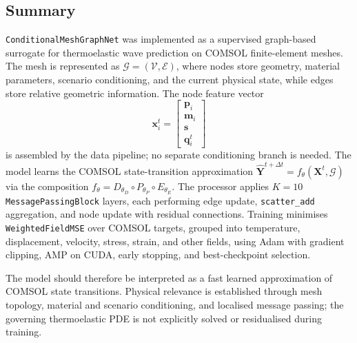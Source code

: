 \subsection{Summary}

\texttt{ConditionalMeshGraphNet} was implemented as a supervised graph-based
surrogate for thermoelastic wave prediction on COMSOL finite-element meshes.
The mesh is represented as \(\mathcal{G}=(\mathcal{V},\mathcal{E})\), where
nodes store geometry, material parameters, scenario conditioning, and the
current physical state, while edges store relative geometric information.
The node feature vector
\[
  \mathbf{x}_i^t
  =
  \begin{bmatrix}
    \mathbf{p}_i \\ \mathbf{m}_i \\ \mathbf{s} \\ \mathbf{q}_i^t
  \end{bmatrix}
\]
is assembled by the data pipeline; no separate conditioning branch is needed.
The model learns the COMSOL state-transition approximation
\(\hat{\mathbf{Y}}^{t+\Delta t}=f_{\theta}(\mathbf{X}^{t},\mathcal{G})\)
via the composition
\(f_{\theta} = D_{\theta_D}\circ P_{\theta_P}\circ E_{\theta_E}\).
The processor applies \(K=10\) \texttt{MessagePassingBlock} layers, each
performing edge update, \texttt{scatter\_add} aggregation, and node update
with residual connections.
Training minimises \texttt{WeightedFieldMSE} over COMSOL targets, grouped
into temperature, displacement, velocity, stress, strain, and other fields,
using Adam with gradient clipping, AMP on CUDA, early stopping, and
best-checkpoint selection.

The model should therefore be interpreted as a fast learned approximation of
COMSOL state transitions.
Physical relevance is established through mesh topology, material and scenario
conditioning, and localised message passing; the governing thermoelastic PDE
is not explicitly solved or residualised during training.

